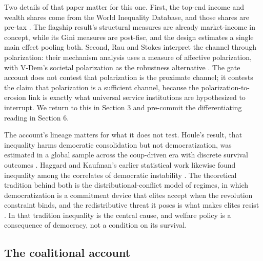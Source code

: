 \documentclass[11pt,letterpaper]{article}
\begin{document}
Two details of that paper matter for this one. First, the top-end income and wealth shares come from the World Inequality Database, and those shares are pre-tax \citep{RauStokes2025}. The flagship result's structural measures are already market-income in concept, while its Gini measures are post-fisc, and the design estimates a single main effect pooling both. Second, Rau and Stokes interpret the channel through polarization: their mechanism analysis uses a measure of affective polarization, with V-Dem's societal polarization as the robustness alternative \citep{RauStokes2025, Svolik2019}. The gate account does not contest that polarization is the proximate channel; it contests the claim that polarization is a sufficient channel, because the polarization-to-erosion link is exactly what universal service institutions are hypothesized to interrupt. We return to this in Section 3 and pre-commit the differentiating reading in Section 6.

The account's lineage matters for what it does not test. Houle's result, that inequality harms democratic consolidation but not democratization, was estimated in a global sample across the coup-driven era with discrete survival outcomes \citep{Houle2009}. Haggard and Kaufman's earlier statistical work likewise found inequality among the correlates of democratic instability \citep{HaggardKaufman2012}. The theoretical tradition behind both is the distributional-conflict model of regimes, in which democratization is a commitment device that elites accept when the revolution constraint binds, and the redistributive threat it poses is what makes elites resist \citep{AcemogluRobinson2006, Boix2003, AnsellSamuels2014}. In that tradition inequality is the central cause, and welfare policy is a consequence of democracy, not a condition on its survival.

\subsection{The coalitional account}
\end{document}

